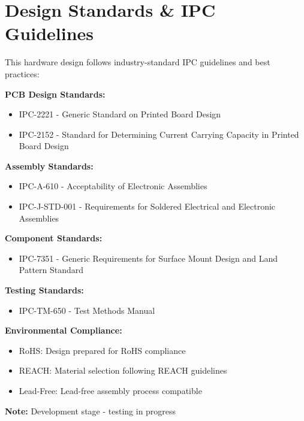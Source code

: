 \documentclass[11pt,a4paper]{article}
\begin{document}
\section*{Design Standards \& IPC Guidelines}

\begin{tcolorbox}[
    colback=blue!5!white,
    colframe=blue!50!black,
    title=IPC Standards Reference,
    fonttitle=\bfseries
]

This hardware design follows industry-standard IPC guidelines and best practices:

\vspace{0.3cm}
\textbf{PCB Design Standards:}
\begin{itemize}
    \item IPC-2221 - Generic Standard on Printed Board Design
    \item IPC-2152 - Standard for Determining Current Carrying Capacity in Printed Board Design
\end{itemize}

\textbf{Assembly Standards:}
\begin{itemize}
    \item IPC-A-610 - Acceptability of Electronic Assemblies
    \item IPC-J-STD-001 - Requirements for Soldered Electrical and Electronic Assemblies
\end{itemize}

\textbf{Component Standards:}
\begin{itemize}
    \item IPC-7351 - Generic Requirements for Surface Mount Design and Land Pattern Standard
\end{itemize}

\textbf{Testing Standards:}
\begin{itemize}
    \item IPC-TM-650 - Test Methods Manual
\end{itemize}

\end{tcolorbox}

\vspace{0.5cm}
\begin{tcolorbox}[
    colback=orange!5!white,
    colframe=orange!50!black,
    title=Compliance Status (Development Phase),
    fonttitle=\bfseries
]

\textbf{Environmental Compliance:}
\begin{itemize}
    \item RoHS: Design prepared for RoHS compliance
    \item REACH: Material selection following REACH guidelines
    \item Lead-Free: Lead-free assembly process compatible
\end{itemize}

\textbf{Note:} Development stage - testing in progress

\end{tcolorbox}
\newpage
\end{document}
